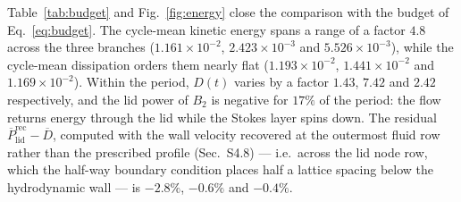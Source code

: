 \documentclass[11pt,a4paper]{article}
\newcommand{\Dbar}{\overline{D}}
\newenvironment{chgadd}{\par\color{blue}}{\par\color{black}}
\begin{document}
\begin{chgadd}
Table~\ref{tab:budget} and Fig.~\ref{fig:energy} close the comparison with the
budget of Eq.~\eqref{eq:budget}. The cycle-mean kinetic energy spans a range of a
factor $4.8$ across the three branches ($1.161\times10^{-2}$,
$2.423\times10^{-3}$ and $5.526\times10^{-3}$), while the cycle-mean dissipation
orders them nearly flat ($1.193\times10^{-2}$, $1.441\times10^{-2}$ and
$1.169\times10^{-2}$). Within the period, $D(t)$ varies by a factor $1.43$, $7.42$
and $2.42$ respectively, and the lid power of $B_2$ is negative for $17\%$ of the
period: the flow returns energy through the lid while the Stokes layer spins down.
The residual $\overline{P}_{\mathrm{lid}}^{\mathrm{rec}}-\Dbar$, computed with the
wall velocity recovered at the outermost fluid row rather than the prescribed profile
(Sec.~S4.8) --- i.e.\ across the lid node row, which the half-way boundary
condition places half a lattice spacing below the hydrodynamic wall --- is
$-2.8\%$, $-0.6\%$ and $-0.4\%$.


\end{chgadd}
\end{document}
